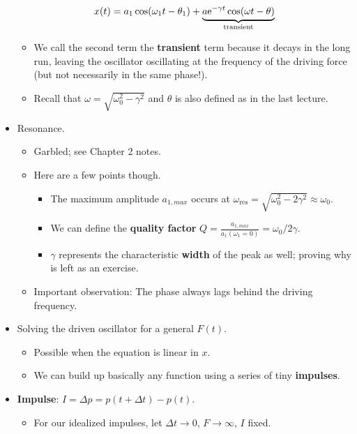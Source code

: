 \documentclass[../notes.tex]{subfiles}
\begin{document}
\begin{itemize}
    \begin{equation*}
        x(t) = a_1\cos(\omega_1t-\theta_1)+\underbrace{a\e[-\gamma t]\cos(\omega t-\theta)}_\text{transient}
    \end{equation*}
    \begin{itemize}
        \item We call the second term the \textbf{transient} term because it decays in the long run, leaving the oscillator oscillating at the frequency of the driving force (but not necessarily in the same phase!).
        \item Recall that $\omega=\sqrt{\omega_0^2-\gamma^2}$ and $\theta$ is also defined as in the last lecture.
    \end{itemize}
    \item Resonance.
    \begin{itemize}
        \item Garbled; see \textcite{bib:KibbleBerkshire} Chapter 2 notes.
        \item Here are a few points though.
        \begin{itemize}
            \item The maximum amplitude $a_{1,max}$ occurs at $\omega_\text{res}=\sqrt{\omega_0^2-2\gamma^2}\approx\omega_0$.
            \item We can define the \textbf{quality factor} $Q=\frac{a_{1,max}}{a_1(\omega_1=0)}=\omega_0/2\gamma$.
            \item $\gamma$ represents the characteristic \textbf{width} of the peak as well; proving why is left as an exercise.
        \end{itemize}
        \item Important observation: The phase always lags behind the driving frequency.
    \end{itemize}
    \item Solving the driven oscillator for a general $F(t)$.
    \begin{itemize}
        \item Possible when the equation is linear in $x$.
        \item We can build up basically any function using a series of tiny \textbf{impulses}.
    \end{itemize}
    \item \textbf{Impulse}: $I=\Delta p=p(t+\Delta t)-p(t)$.
    \begin{itemize}
        \item For our idealized impulses, let $\Delta t\to 0$, $F\to\infty$, $I$ fixed.

\end{itemize}
\end{itemize}
\end{document}
